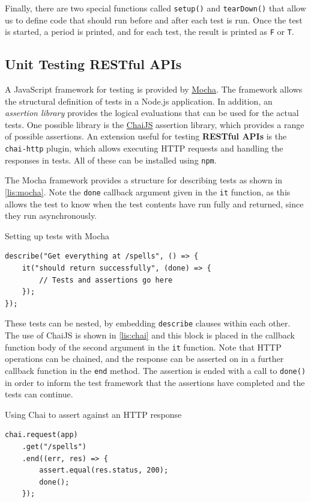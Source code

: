 Finally, there are two special functions called \texttt{setup()} and \texttt{tearDown()} that allow us to define code that should run before and after each test is run. Once the test is started, a period is printed, and for each test, the result is printed as \texttt{F} or \texttt{T}.

\subsection{Unit Testing RESTful APIs}
A JavaScript framework for testing is provided by \href{https://mochajs.org}{Mocha}. The framework allows the structural definition of tests in a Node.js application. In addition, an \emph{assertion library} provides the logical evaluations that can be used for the actual tests. One possible library is the \href{https://chaijs.org}{ChaiJS} assertion library, which provides a range of possible assertions. An extension useful for testing \textbf{RESTful APIs} is the \texttt{chai-http} plugin, which allows executing HTTP requests and handling the responses in tests. All of these can be installed using \texttt{npm}.

The Mocha framework provides a structure for describing tests as shown in \autoref{lis:mocha}. Note the \texttt{done} callback argument given in the \texttt{it} function, as this allows the test to know when the test contents have run fully and returned, since they run asynchronously.

\begin{listing}[H]
\caption{Setting up tests with Mocha}
\label{lis:mocha}
\begin{verbatim}
describe("Get everything at /spells", () => {
	it("should return successfully", (done) => {
		// Tests and assertions go here
	});
});
\end{verbatim}
\end{listing}

These tests can be nested, by embedding \texttt{describe} clauses within each other. The use of ChaiJS is shown in \autoref{lis:chai} and this block is placed in the callback function body of the second argument in the \texttt{it} function. Note that HTTP operations can be chained, and the response can be asserted on in a further callback function in the \texttt{end} method. The assertion is ended with a call to \texttt{done()} in order to inform the test framework that the assertions have completed and the tests can continue.

\begin{listing}[H]
\caption{Using Chai to assert against an HTTP response}
\label{lis:chai}
\begin{verbatim}
chai.request(app)
	.get("/spells")
	.end((err, res) => {
		assert.equal(res.status, 200);
		done();
	});
\end{verbatim}
\end{listing}

